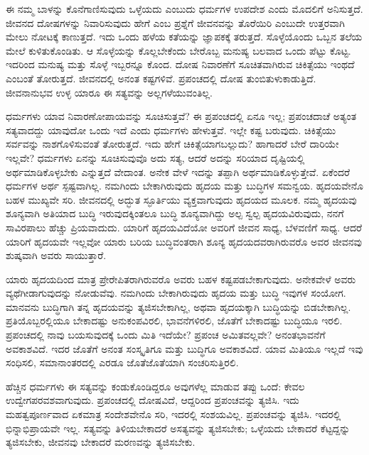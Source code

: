 \vskip 0.2cm 

ಈ ನಮ್ಮ ಬಾಳನ್ನು ಕೊನೆಗಾಣಿಸುವುದು ಒಳ್ಳೆಯದು ಎಂಬುದು ಧರ್ಮಗಳ ಉಪದೇಶ ಎಂದು ಮೊದಲಿಗೆ ಅನಿಸುತ್ತದೆ. ಜೀವನದ ದೋಷಗಳನ್ನು ನಿವಾರಿಸುವುದು ಹೇಗೆ ಎಂಬ ಪ್ರಶ್ನೆಗೆ ಜೀವನವನ್ನು ತೊರೆಯಿರಿ ಎಂಬುದೇ ಉತ್ತರವಾಗಿ ಮೇಲು ನೋಟಕ್ಕೆ ಕಾಣುತ್ತದೆ. ಇದು ಒಂದು ಹಳೆಯ ಕತೆಯನ್ನು ಜ್ಞಾಪಕಕ್ಕೆ ತರುತ್ತದೆ. ಸೊಳ್ಳೆಯೊಂದು ಒಬ್ಬನ ತಲೆಯ ಮೇಲೆ ಕುಳಿತುಕೊಂಡಿತು. ಆ ಸೊಳ್ಳೆಯನ್ನು ಕೊಲ್ಲಬೇಕೆಂದು ಬೇರೊಬ್ಬ ಮನುಷ್ಯ ಬಲವಾದ ಒಂದು ಪೆಟ್ಟು ಕೊಟ್ಟ. ಇದರಿಂದ ಮನುಷ್ಯ ಮತ್ತು ಸೊಳ್ಳೆ ಇಬ್ಬರನ್ನೂ ಕೊಂದ. ದೋಷ ನಿವಾರಣೆಗೆ ಸೂಚಿತವಾಗಿರುವ ಚಿಕಿತ್ಸೆಯು ಇಂಥದೆ ಎಂಬಂತೆ ತೋರುತ್ತದೆ. ಜೀವನದಲ್ಲಿ ಅನಂತ ಕಷ್ಟಗಳಿವೆ. ಪ್ರಪಂಚದಲ್ಲಿ ದೋಷ ತುಂಬಿತುಳುಕಾಡುತ್ತಿದೆ. ಜೀವನಾನುಭವ ಉಳ್ಳ ಯಾರೂ ಈ ಸತ್ಯವನ್ನು ಅಲ್ಲಗಳೆಯುವಂತಿಲ್ಲ.

\vskip 0.2cm 

ಧರ್ಮಗಳು ಯಾವ ನಿವಾರಣೋಪಾಯವನ್ನು ಸೂಚಿಸುತ್ತವೆ? ಈ ಪ್ರಪಂಚದಲ್ಲಿ ಏನೂ ಇಲ್ಲ; ಪ್ರಪಂಚದಾಚೆ ಅತ್ಯಂತ ಸತ್ಯವಾದದ್ದು ಯಾವುದೋ ಒಂದು ಇದೆ ಎಂದು ಧರ್ಮಗಳು ಹೇಳುತ್ತವೆ. ಇಲ್ಲೇ ಕಷ್ಟ ಬರುವುದು. ಚಿಕಿತ್ಸೆಯು ಸರ್ವವನ್ನು ನಾಶಗೊಳಿಸುವಂತೆ ತೋರುತ್ತದೆ. ಇದು ಹೇಗೆ ಚಿಕಿತ್ಸೆಯಾಗಬಲ್ಲುದು? ಹಾಗಾದರೆ ಬೇರೆ ದಾರಿಯೇ ಇಲ್ಲವೇ? ಧರ್ಮಗಳು ಏನನ್ನು ಸೂಚಿಸುವುವೊ ಅದು ಸತ್ಯ, ಆದರೆ ಅದನ್ನು ಸರಿಯಾದ ದೃಷ್ಟಿಯಲ್ಲಿ ಅರ್ಥಮಾಡಿಕೊಳ್ಳಬೇಕು ಎನ್ನುತ್ತದೆ ವೇದಾಂತ. ಅನೇಕ ವೇಳೆ ಇದನ್ನು ತಪ್ಪಾಗಿ ಅರ್ಥಮಾಡಿಕೊಳ್ಳುತ್ತೇವೆ. ಏಕೆಂದರೆ ಧರ್ಮಗಳ ಅರ್ಥ ಸ್ಪಷ್ಟವಾಗಿಲ್ಲ. ನಮಗಿಂದು ಬೇಕಾಗಿರುವುದು ಹೃದಯ ಮತ್ತು ಬುದ್ಧಿಗಳ ಸಮನ್ವಯ. ಹೃದಯವೇನೊ ಬಹಳ ಮುಖ್ಯವೇ ಸರಿ. ಜೀವನದಲ್ಲಿ ಅದ್ಭುತ ಸ್ಫೂರ್ತಿಯು ವ್ಯಕ್ತವಾಗುವುದು ಹೃದಯದ ಮೂಲಕ. ನಮ್ಮ ಹೃದಯವು ಶೂನ್ಯವಾಗಿ ಅತಿಯಾದ ಬುದ್ಧಿ ಇರುವುದಕ್ಕಿಂತಲೂ ಬುದ್ಧಿ ಶೂನ್ಯವಾಗಿದ್ದು ಅಲ್ಪ ಸ್ವಲ್ಪ ಹೃದಯವಿರುವುದು, ನನಗೆ ಸಾವಿರಪಾಲು ಹೆಚ್ಚು ಪ್ರಿಯವಾದುದು. ಯಾರಿಗೆ ಹೃದಯವಿದೆಯೋ ಅವರಿಗೆ ಜೀವನ ಸಾಧ್ಯ, ಬೆಳವಣಿಗೆ ಸಾಧ್ಯ. ಆದರೆ ಯಾರಿಗೆ ಹೃದಯವೇ ಇಲ್ಲವೋ ಯಾರು ಬರಿಯ ಬುದ್ಧಿವಂತರಾಗಿ ಶೂನ್ಯ ಹೃದಯದವರಾಗಿರುವರೊ ಅವರ ಜೀವನವು ಶುಷ್ಕವಾಗಿ ಅವರು ಸಾಯುತ್ತಾರೆ.

\vskip 0.2cm 

ಯಾರು ಹೃದಯದಿಂದ ಮಾತ್ರ ಪ್ರೇರೇಪಿತರಾಗಿರುವರೊ ಅವರು ಬಹಳ ಕಷ್ಟಪಡಬೇಕಾಗುವುದು. ಅನೇಕವೇಳೆ ಅವರು ವ್ಯಥೆಗೀಡಾಗುವುದನ್ನು ನೋಡುವೆವು. ನಮಗಿಂದು ಬೇಕಾಗಿರುವುದು ಹೃದಯ ಮತ್ತು ಬುದ್ಧಿ ಇವುಗಳ ಸಂಯೋಗ. ಮಾನವನು ಬುದ್ಧಿಗಾಗಿ ತನ್ನ ಹೃದಯವನ್ನು ತ್ಯಜಿಸಬೇಕಾಗಿಲ್ಲ, ಅಥವಾ ಹೃದಯಕ್ಕಾಗಿ ಬುದ್ಧಿಯನ್ನು ಬಿಡಬೇಕಾಗಿಲ್ಲ. ಪ್ರತಿಯೊಬ್ಬರಲ್ಲಿಯೂ ಬೇಕಾದಷ್ಟು ಅನುಕಂಪವಿರಲಿ, ಭಾವನೆಗಳಿರಲಿ, ಜೊತೆಗೆ ಬೇಕಾದಷ್ಟು ಬುದ್ಧಿಯೂ ಇರಲಿ. ಪ್ರಪಂಚದಲ್ಲಿ ನಾವು ಬಯಸುವುದಕ್ಕೆ ಒಂದು ಮಿತಿ ಇದೆಯೇ? ಪ್ರಪಂಚ ಅಮಿತವಲ್ಲವೇ? ಅನಂತಭಾವನೆಗೆ ಅವಕಾಶವಿದೆ. ಇದರ ಜೊತೆಗೆ ಅನಂತ ಸಂಸ್ಕೃತಿಗೂ ಮತ್ತು ಬುದ್ಧಿಗೂ ಅವಕಾಶವಿದೆ. ಯಾವ ಮಿತಿಯೂ ಇಲ್ಲದೆ ಇವು ಸಂಧಿಸಲಿ, ಸಮಾನಾಂತರದಲ್ಲಿ ಎರಡೂ ಜೊತೆಜೊತೆಯಾಗಿ ಸಂಚರಿಸುತ್ತಿರಲಿ.

\vskip 0.2cm 

ಹೆಚ್ಚಿನ ಧರ್ಮಗಳು ಈ ಸತ್ಯವನ್ನು ಕಂಡುಕೊಂಡಿದ್ದರೂ ಅವುಗಳೆಲ್ಲ ಮಾಡುವ ತಪ್ಪು ಒಂದೆ: ಕೇವಲ ಉದ್ವೇಗಪರವಶವಾಗುವುದು. ಪ್ರಪಂಚದಲ್ಲಿ ದೋಷವಿದೆ, ಆದ್ದರಿಂದ ಪ್ರಪಂಚವನ್ನು ತ್ಯಜಿಸಿ. ಇದು ಮಹತ್ವಪೂರ್ಣವಾದ ಏಕಮಾತ್ರ ಸಂದೇಶವೇನೊ ಸರಿ, ಇದರಲ್ಲಿ ಸಂಶಯವಿಲ್ಲ. ಪ್ರಪಂಚವನ್ನು ತ್ಯಜಿಸಿ. ಇದರಲ್ಲಿ ಭಿನ್ನಾಭಿಪ್ರಾಯವೇ ಇಲ್ಲ. ಸತ್ಯವನ್ನು ತಿಳಿಯಬೇಕಾದರೆ ಅಸತ್ಯವನ್ನು ತ್ಯಜಿಸಬೇಕು; ಒಳ್ಳೆಯದು ಬೇಕಾದರೆ ಕೆಟ್ಟದ್ದನ್ನು ತ್ಯಜಿಸಬೇಕು, ಜೀವನವು ಬೇಕಾದರೆ ಮರಣವನ್ನು ತ್ಯಜಿಸಬೇಕು.


